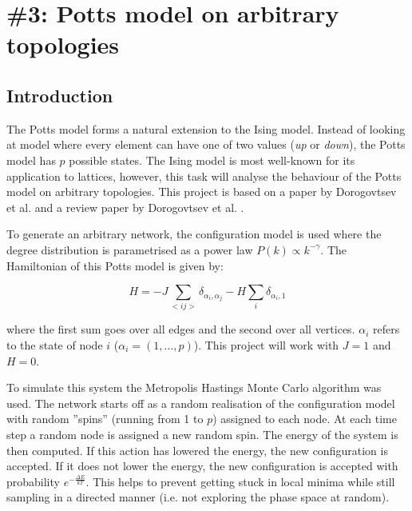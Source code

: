 \chapter{\#3: Potts model on arbitrary topologies}



\section{Introduction}
 
The Potts model forms a natural extension to the Ising model. Instead of looking at model where every element can have one of two values (\textit{up} or \textit{down}), the Potts model has $p$ possible states. The Ising model is most well-known for its application to lattices, however, this task will analyse the behaviour of the Potts model on arbitrary topologies. This project is based on a paper by Dorogovtsev et al. \cite{pottspaper} and a review paper by Dorogovtsev et al. \cite{pottsreview}.

To generate an arbitrary network, the configuration model is used where the degree distribution is parametrised as a power law $P(k) \propto k^{-\gamma}$. The Hamiltonian of this Potts model is given by:

\begin{equation}
    H = -J \sum_{<ij>} \delta_{\alpha_i, \alpha_j} - H \sum_i \delta_{\alpha_i, 1}
\end{equation}

\noindent where the first sum goes over all edges and the second over all vertices. $\alpha_i$ refers to the state of node $i$ ($\alpha_i = (1, ..., p)$). This project will work with $J = 1$ and $H = 0$.

To simulate this system the Metropolis Hastings Monte Carlo algorithm was used. The network starts off as a random realisation of the configuration model with random ''spins'' (running from 1 to $p$) assigned to each node. At each time step a random node is assigned a new random spin. The energy of the system is then computed. If this action has lowered the energy, the new configuration is accepted. If it does not lower the energy, the new configuration is accepted with probability $e^{-\frac{\Delta E}{kT}}$. This helps to prevent getting stuck in local minima while still sampling in a directed manner (i.e. not exploring the phase space at random).

